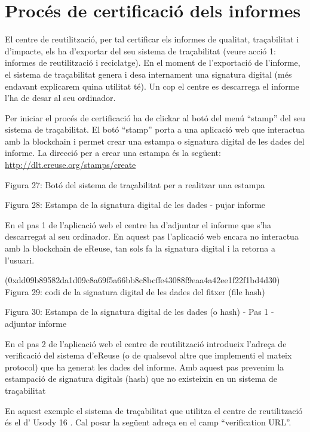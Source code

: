 \documentclass[
]{book}
\begin{document}
\hypertarget{procuxe9s-de-certificaciuxf3-dels-informes}{%
\section{Procés de certificació dels informes}\label{procuxe9s-de-certificaciuxf3-dels-informes}}

El centre de reutilització, per tal certificar els informes de qualitat, traçabilitat i d'impacte, els ha d'exportar del seu sistema de traçabilitat (veure acció 1: informes de reutilització i reciclatge). En el moment de l'exportació de l'informe, el sistema de traçabilitat genera i desa internament una signatura digital (més endavant explicarem quina utilitat té). Un cop el centre es descarrega el informe l'ha de desar al seu ordinador.

Per iniciar el procés de certificació ha de clickar al botó del menú ``stamp'' del seu sistema de traçabilitat. El botó ``stamp'' porta a una aplicació web que interactua amb la blockchain i permet crear una estampa o signatura digital de les dades del informe. La direcció per a crear una estampa és la següent: \url{http://dlt.ereuse.org/stamps/create}

Figura 27: Botó del sistema de traçabilitat per a realitzar una estampa

Figura 28: Estampa de la signatura digital de les dades - pujar informe

En el pas 1 de l'aplicació web el centre ha d'adjuntar el informe que s'ha descarregat al seu ordinador. En aquest pas l'aplicació web encara no interactua amb la blockchain de eReuse, tan sols fa la signatura digital i la retorna a l'usuari.

(0xdd09b89582da1d09c8a69f5a66bb8c8bcffe43088f9eaa4a42ee1f22f1bd4d30) Figura 29: codi de la signatura digital de les dades del fitxer (file hash)

Figura 30: Estampa de la signatura digital de les dades (o hash) - Pas 1 - adjuntar informe

En el pas 2 de l'aplicació web el centre de reutilització introdueix l'adreça de verificació del sistema d'eReuse (o de qualsevol altre que implementi el mateix protocol) que ha generat les dades del informe. Amb aquest pas prevenim la estampació de signatura digitals (hash) que no existeixin en un sistema de traçabilitat

En aquest exemple el sistema de traçabilitat que utilitza el centre de reutilització és el d' Usody 16 . Cal posar la següent adreça en el camp ``verification URL''.
\end{document}
